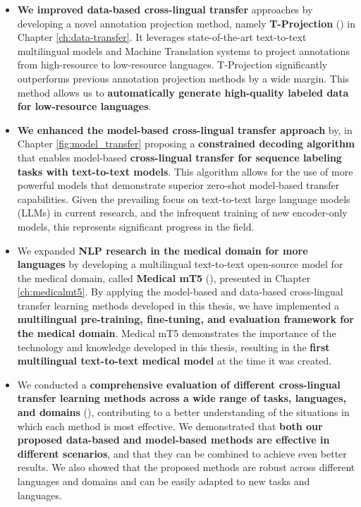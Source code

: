 \begin{itemize}
    \item \textbf{We improved data-based cross-lingual transfer} approaches by developing a novel annotation projection method, namely \textbf{T-Projection} (\cite{garcia-ferrero-etal-2023-projection}) in Chapter \ref{ch:data-transfer}. It leverages state-of-the-art text-to-text multilingual models and Machine Translation systems to project annotations from high-resource to low-resource languages. T-Projection significantly outperforms previous annotation projection methods by a wide margin. This method allows us to \textbf{automatically generate high-quality labeled data for low-resource languages}.
    
    \item \textbf{We enhanced the model-based cross-lingual transfer approach} by, in Chapter \ref{fig:model_transfer} proposing a \textbf{constrained decoding algorithm} that enables model-based \textbf{cross-lingual transfer for sequence labeling tasks with text-to-text models}. This algorithm allows for the use of more powerful models that demonstrate superior zero-shot model-based transfer capabilities. Given the prevailing focus on text-to-text large language models (LLMs) in current research, and the infrequent training of new encoder-only models, this represents significant progress in the field.
    
    \item We expanded \textbf{NLP research in the medical domain for more languages} by developing a multilingual text-to-text open-source model for the medical domain, called \textbf{Medical mT5} (\cite{garcia-ferrero-etal-2024-medmt5}), presented in Chapter \ref{ch:medicalmt5}. By applying the model-based and data-based cross-lingual transfer learning methods developed in this thesis, we have implemented a \textbf{multilingual pre-training, fine-tuning, and evaluation framework for the medical domain}. Medical mT5 demonstrates the importance of the technology and knowledge developed in this thesis, resulting in the \textbf{first multilingual text-to-text medical model} at the time it was created.
    
    \item We conducted a \textbf{comprehensive evaluation of different cross-lingual transfer learning methods across a wide range of tasks, languages, and domains} (\cite{garcia-ferrero-etal-2022-model}), contributing to a better understanding of the situations in which each method is most effective. We demonstrated that \textbf{both our proposed data-based and model-based methods are effective in different scenarios}, and that they can be combined to achieve even better results. We also showed that the proposed methods are robust across different languages and domains and can be easily adapted to new tasks and languages.
    

\end{itemize}
